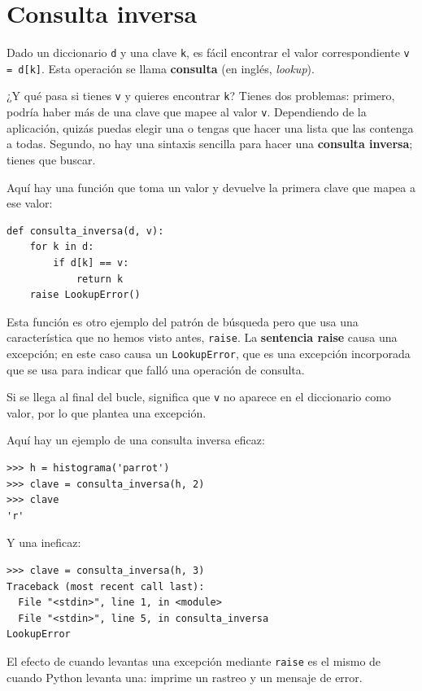 \documentclass[10pt]{book}
\begin{document}
\section{Consulta inversa}
\label{raise}

Dado un diccionario {\tt d} y una clave {\tt k}, es fácil
encontrar el valor correspondiente {\tt v = d[k]}.  Esta operación
se llama {\bf consulta} (en inglés, {\em lookup}).

¿Y qué pasa si tienes {\tt v} y quieres encontrar {\tt k}?
Tienes dos problemas: primero, podría haber más de una
clave que mapee al valor {\tt v}.  Dependiendo de la aplicación,
quizás puedas elegir una o tengas que hacer
una lista que las contenga a todas.  Segundo, no hay
una sintaxis sencilla para hacer una {\bf consulta inversa}; tienes que buscar.

Aquí hay una función que toma un valor y devuelve la primera
clave que mapea a ese valor:

\begin{verbatim}
def consulta_inversa(d, v):
    for k in d:
        if d[k] == v:
            return k
    raise LookupError()
\end{verbatim}
%
Esta función es otro ejemplo del patrón de búsqueda pero que
usa una característica que no hemos visto antes, {\tt raise}.  La
{\bf sentencia raise} causa una excepción; en este caso causa un
{\tt LookupError}, que es una excepción incorporada que se usa para indicar
que falló una operación de consulta.
  
 

Si se llega al final del bucle, significa que {\tt v}
no aparece en el diccionario como valor, por lo que plantea una
excepción.

Aquí hay un ejemplo de una consulta inversa eficaz:

\begin{verbatim}
>>> h = histograma('parrot')
>>> clave = consulta_inversa(h, 2)
>>> clave 
'r'
\end{verbatim}
%
Y una ineficaz:

\begin{verbatim}
>>> clave = consulta_inversa(h, 3)
Traceback (most recent call last):
  File "<stdin>", line 1, in <module>
  File "<stdin>", line 5, in consulta_inversa
LookupError
\end{verbatim}
%
El efecto de cuando levantas una excepción mediante {\tt raise} es el mismo de cuando
Python levanta una: imprime un rastreo y un mensaje de error.
\end{document}
